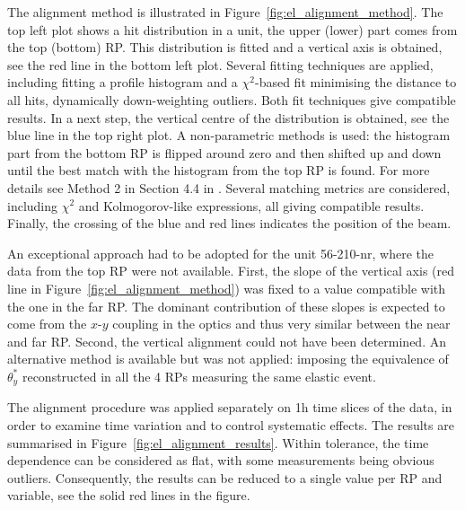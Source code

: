 \documentclass[TOTEM]{cern/cernphprep}
\begin{document}
The alignment method is illustrated in Figure~\ref{fig:el_alignment_method}. The top left plot shows a hit distribution in a unit, the upper (lower) part comes from the top (bottom) RP. This distribution is fitted and a vertical axis is obtained, see the red line in the bottom left plot. Several fitting techniques are applied, including fitting a profile histogram and a $\chi^2$-based fit minimising the distance to all hits, dynamically down-weighting outliers. Both fit techniques give compatible results. In a next step, the vertical centre of the distribution is obtained, see the blue line in the top right plot. A non-parametric methods is used: the histogram part from the bottom RP is flipped around zero and then shifted up and down until the best match with the histogram from the top RP is found. For more details see Method 2 in Section 4.4 in \cite{jan_thesis}. Several matching metrics are considered, including $\chi^2$ and Kolmogorov-like expressions, all giving compatible results. Finally, the crossing of the blue and red lines indicates the position of the beam.

An exceptional approach had to be adopted for the unit 56-210-nr, where the data from the top RP were not available. First, the slope of the vertical axis (red line in Figure~\ref{fig:el_alignment_method}) was fixed to a value compatible with the one in the far RP. The dominant contribution of these slopes is expected to come from the $x$-$y$ coupling in the optics and thus very similar between the near and far RP. Second, the vertical alignment could not have been determined. An alternative method is available but was not applied: imposing the equivalence of $\theta_y^*$ reconstructed in all the 4 RPs measuring the same elastic event.

The alignment procedure was applied separately on 1h time slices of the data, in order to examine time variation and to control systematic effects. The results are summarised in Figure~\ref{fig:el_alignment_results}. Within tolerance, the time dependence can be considered as flat, with some measurements being obvious outliers. Consequently, the results can be reduced to a single value per RP and variable, see the solid red lines in the figure.
\end{document}
